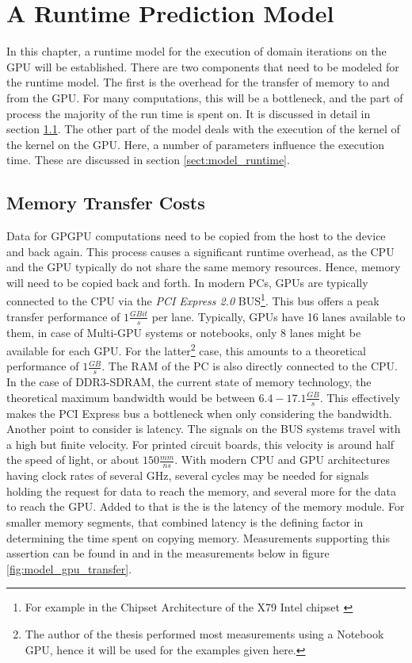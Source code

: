 
\chapter{A Runtime Prediction Model}
\label{chap:model}
In this chapter, a runtime model for the execution of domain iterations on the GPU will be established. There are two components that need to be modeled for the runtime model. The first is the overhead for the transfer of memory to and from the GPU. For many computations, this will be a bottleneck, and the part of process the majority of the run time is spent on. It is discussed in detail in section \ref{sect:model_transfer}. The other part of the model deals with the execution of the kernel of the kernel on the GPU. Here, a number of parameters influence the execution time. These are discussed in section \ref{sect:model_runtime}.


\section{Memory Transfer Costs}
\label{sect:model_transfer}
Data for GPGPU computations need to be copied from the host to the device and back again. This process causes a significant runtime overhead, as the CPU and the GPU typically do not share the same memory resources. Hence, memory will need to be copied back and forth. In modern PCs, GPUs are typically connected to the CPU via the \textit{PCI Express 2.0} BUS\footnote{For example in the Chipset Architecture of the X79 Intel chipset \cite{intel2011x79}}. This bus offers a peak transfer performance of $1 \frac{GBit}{s}$ per lane. Typically, GPUs have 16 lanes available to them, in case of Multi-GPU systems or notebooks, only 8 lanes might be available for each GPU. For the latter\footnote{The author of the thesis performed most measurements using a Notebook GPU, hence it will be used for the examples given here.} case, this amounts to a theoretical performance of $1\frac{GB}{s}$. The RAM of the PC is also directly connected to the CPU. In the case of DDR3-SDRAM, the current state of memory technology, the theoretical maximum bandwidth would be between $6.4 - 17.1 \frac{GB}{s}$. This effectively makes the PCI Express bus a bottleneck when only considering the bandwidth. \cite{intel2011x79, schnabel2014ddr} \\

Another point to consider is latency. The signals on the BUS systems travel with a high but finite velocity. For printed circuit boards, this velocity is around half the speed of light, or about $150\frac{mm}{ns}$. With modern CPU and GPU architectures having clock rates of several GHz, several cycles may be needed for signals holding the request for data to reach the memory, and several more for the data to reach the GPU. Added to that is the is the latency of the memory module. For smaller memory segments, that combined latency is the defining factor in determining the time spent on copying memory. Measurements supporting this assertion can be found in \cite{fujii2013data} and in the measurements below in figure \ref{fig:model_gpu_transfer}. \cite{weiler2006guidelines, fujii2013data} \\

